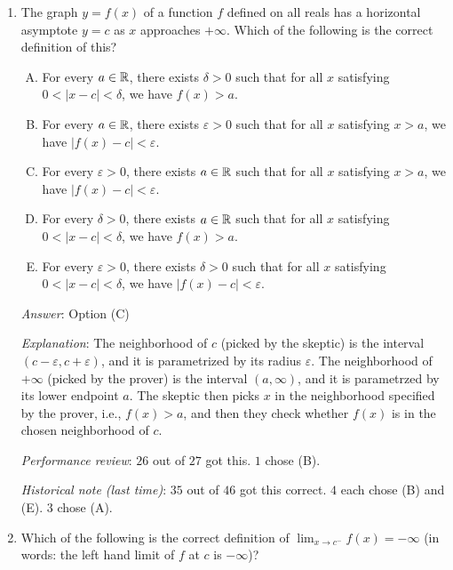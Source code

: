 \documentclass[10pt]{amsart}
\begin{document}
\begin{enumerate}
  {\em Historical note (last time)}: $39$ out of $49$ people got this
  correct. $7$ chose (D), $2$ chose (A), $1$ chose (E).

\item The graph $y = f(x)$ of a function $f$ defined on all reals has
  a horizontal asymptote $y = c$ as $x$ approaches $+\infty$. Which of
  the following is the correct definition of this?

  \begin{enumerate}[(A)]
  \item For every $a \in \mathbb{R}$, there exists $\delta > 0$ such that for
    all $x$ satisfying $0 < |x - c| < \delta$, we have $f(x) > a$.
  \item For every $a \in \mathbb{R}$, there exists $\varepsilon > 0$ such that
    for all $x$ satisfying $x > a$, we have $|f(x) - c| < \varepsilon$.
  \item For every $\varepsilon > 0$, there exists $a \in \mathbb{R}$ such that
    for all $x$ satisfying $x > a$, we have $|f(x) - c| < \varepsilon$.
  \item For every $\delta > 0$, there exists $a \in \mathbb{R}$ such that for
    all $x$ satisfying $0 < |x - c| < \delta$, we have $f(x) > a$.
  \item For every $\varepsilon > 0$, there exists $\delta > 0$ such
    that for all $x$ satisfying $0 < |x - c| < \delta$, we have $|f(x)
    - c| < \varepsilon$.
  \end{enumerate}

  {\em Answer}: Option (C)

  {\em Explanation}: The neighborhood of $c$ (picked by the skeptic)
  is the interval $(c - \varepsilon, c + \varepsilon)$, and it is
  parametrized by its radius $\varepsilon$. The neighborhood of
  $+\infty$ (picked by the prover) is the interval $(a,\infty)$, and
  it is parametrzed by its lower endpoint $a$. The skeptic then picks
  $x$ in the neighborhood specified by the prover, i.e., $f(x) > a$,
  and then they check whether $f(x)$ is in the chosen neighborhood of
  $c$.

  {\em Performance review}: $26$ out of $27$ got this. $1$ chose (B).

  {\em Historical note (last time)}: $35$ out of $46$ got this correct. $4$
  each chose (B) and (E). $3$ chose (A).

\item Which of the following is the correct definition of
  $\displaystyle \lim_{x \to c^-} f(x) = -\infty$ (in words: the left
  hand limit of $f$ at $c$ is $-\infty$)?


\end{enumerate}
\end{document}
